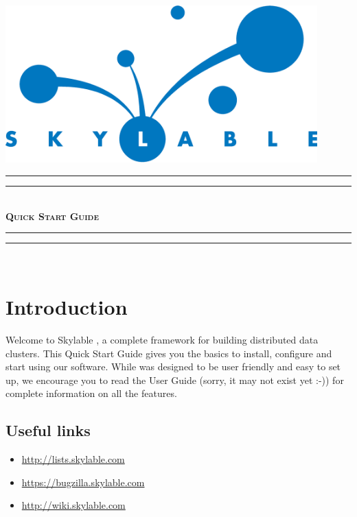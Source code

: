 \pagestyle{empty}

\begin{center}
    \includegraphics[width=120mm]{logo.eps}\\
    \vspace{4cm}
    \rule{\textwidth}{1.6pt}\vspace*{-\baselineskip}\vspace*{2pt}
    \rule{\textwidth}{0.4pt}\\[\baselineskip]
    {\fontsize{40}{50}\bfseries\scshape \SX Quick Start Guide}
    \rule{\textwidth}{0.4pt}\vspace*{-\baselineskip}\vspace{3.2pt}
    \rule{\textwidth}{1.6pt}\\[\baselineskip]
\end{center}


\LARGE
\chapter{Introduction}

\indent Welcome to Skylable \SX, a complete framework for building distributed data
clusters. This Quick Start Guide gives you the basics to install, configure
and start using our software. While \SX was designed to be user friendly and easy to
set up, we encourage you to read the User Guide (sorry, it may not exist yet :-)) for
complete information on all the
features.\\

\section*{Useful links}
\begin{itemize}
    \item \url{http://lists.skylable.com}
    \item \url{https://bugzilla.skylable.com}
    \item \url{http://wiki.skylable.com}
\end{itemize}


